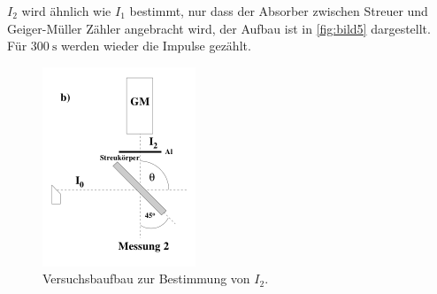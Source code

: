 $I_2$ wird ähnlich wie $I_1$ bestimmt, nur dass der Absorber zwischen Streuer und Geiger-Müller Zähler angebracht wird, der Aufbau ist in \autoref{fig:bild5} dargestellt.
Für $\SI{300}{\second}$ werden wieder die Impulse gezählt.

\begin{figure}
    \centering
    \includegraphics[width=\textwidth/2]{images/bild5.png}
    \caption{Versuchsbaufbau zur Bestimmung von $I_2$. \cite{V603}}
    \label{fig:bild5}
\end{figure}